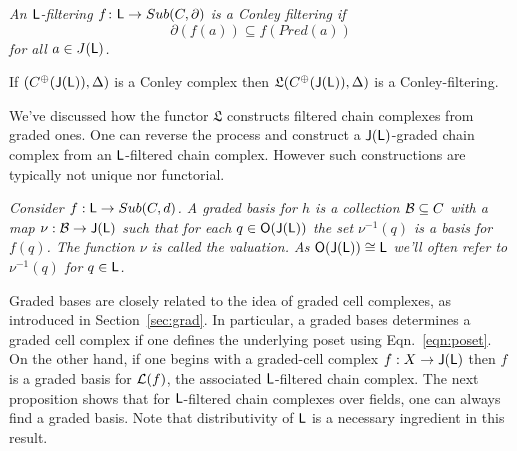 \begin{defn}
{\em 
An ${\mathsf L}$-filtering $f\colon {\mathsf L} \to Sub(C,\partial)$ is a \em{Conley filtering} if
\[
\partial(f(a)) \subseteq f(Pred(a))
\]
for all $a\in J({\mathsf L})$.
}
\end{defn}



\begin{prop}\label{prop:filt:cm}
If $(C^\oplus({\mathsf J}({\mathsf L})),\Delta)$ is a Conley complex then $\mathfrak{L}(C^\oplus({\mathsf J}({\mathsf L})),\Delta)$ is a Conley-filtering.
\end{prop}



We've discussed how the functor $\mathfrak{L}$ constructs filtered chain complexes from graded ones.  One can reverse the process and construct a ${\mathsf J}({\mathsf L})$-graded chain complex from an ${\mathsf L}$-filtered chain complex.  However such constructions are typically not unique nor functorial.


\begin{defn}
{\em
Consider $f:{\mathsf L}\to Sub(C,d)$.  A {\em graded basis for $h$} is a collection ${\mathcal B}\subseteq C$ with a map $\nu:{\mathcal B}\to {\mathsf J}({\mathsf L})$ such that for each $q\in {\mathsf O}({\mathsf J}({\mathsf L}))$ the set $\nu^{-1}(q)$ is a basis for $f(q)$.
 The function $\nu$ is called the {\em valuation}. As ${\mathsf O}({\mathsf J}({\mathsf L})) \cong {\mathsf L}$ we'll often refer to $\nu^{-1}(q)$ for $q\in {\mathsf L}$.  
}
\end{defn}

Graded bases are closely related to the idea of graded cell complexes, as introduced in Section~\ref{sec:grad}.  In particular, a graded bases determines a graded cell complex if one defines the underlying poset using Eqn.~\ref{eqn:poset}.  On the other hand, if one begins with a graded-cell complex $f:X\to {\mathsf J}({\mathsf L})$ then $f$ is a graded basis for ${\mathcal L}(f)$, the associated ${\mathsf L}$-filtered chain complex.   The next proposition shows that for ${\mathsf L}$-filtered chain complexes over fields, one can always find a graded basis.  Note that distributivity of ${\mathsf L}$ is a necessary ingredient in this result.

